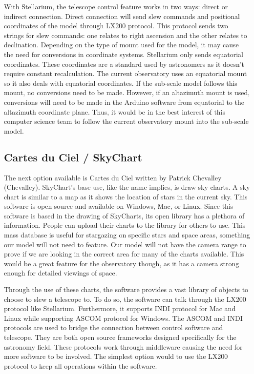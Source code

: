 \documentclass[12pt]{report}
\begin{document}
With Stellarium, the telescope control feature works in two ways: direct or indirect connection. Direct connection will send slew commands and positional coordinates of the model through LX200 protocol. This protocol sends two strings for slew commands: one relates to right ascension and the other relates to declination. Depending on the type of mount used for the model, it may cause the need for conversions in coordinate systems. Stellarium only sends equatorial coordinates. These coordinates are a standard used by astronomers as it doesn't require constant recalculation. The current observatory uses an equatorial mount so it also deals with equatorial coordinates. If the sub-scale model follows this mount, no conversions need to be made. However, if an altazimuth mount is used, conversions will need to be made in the Arduino software from equatorial to the altazimuth coordinate plane. Thus, it would be in the best interest of this computer science team to follow the current observatory mount into the sub-scale model.

\subsection*{Cartes du Ciel / SkyChart}

The next option available is Cartes du Ciel written by Patrick Chevalley (Chevalley). SkyChart's base use, like the name implies, is draw sky charts. A sky chart is similar to a map as it shows the location of stars in the current sky. This software is open-source and available on Windows, Mac, or Linux. Since this software is based in the drawing of SkyCharts, its open library has a plethora of information. People can upload their charts to the library for others to use. This mass database is useful for stargazing on specific stars and space areas, something our model will not need to feature. Our model will not have the camera range to prove if we are looking in the correct area for many of the charts available. This would be a great feature for the observatory though, as it has a camera strong enough for detailed viewings of space.

Through the use of these charts, the software provides a vast library of objects to choose to slew a telescope to. To do so, the software can talk through the LX200 protocol like Stellarium. Furthermore, it supports INDI protocol for Mac and Linux while supporting ASCOM protocol for Windows. The ASCOM and INDI protocols are used to bridge the connection between control software and telescope. They are both open source frameworks designed specifically for the astronomy field. These protocols work through middleware causing the need for more software to be involved. The simplest option would to use the LX200 protocol to keep all operations within the software.
\end{document}
